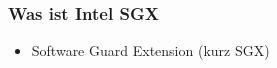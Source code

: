 \begin{frame}
    \frametitle{Was ist Intel SGX}
    \begin{itemize}
        \item Software Guard Extension (kurz SGX)
    \end{itemize}
\end{frame}
